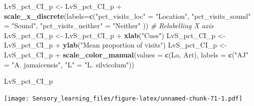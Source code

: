\documentclass[]{article}
\newenvironment{Shaded}{\begin{snugshade}}{\end{snugshade}}
\newcommand{\KeywordTok}[1]{\textcolor[rgb]{0.13,0.29,0.53}{\textbf{{#1}}}}
\newcommand{\DataTypeTok}[1]{\textcolor[rgb]{0.13,0.29,0.53}{{#1}}}
\newcommand{\StringTok}[1]{\textcolor[rgb]{0.31,0.60,0.02}{{#1}}}
\newcommand{\CommentTok}[1]{\textcolor[rgb]{0.56,0.35,0.01}{\textit{{#1}}}}
\newcommand{\NormalTok}[1]{{#1}}
\begin{document}
\begin{Shaded}
\begin{Highlighting}[]
\NormalTok{LvS_pct_CI_p <-}\StringTok{ }\NormalTok{LvS_pct_CI_p +}\StringTok{ }\KeywordTok{scale_x_discrete}\NormalTok{(}\DataTypeTok{labels=}\KeywordTok{c}\NormalTok{(}\StringTok{"pct_visits_loc"} \NormalTok{=}\StringTok{ "Location"}\NormalTok{, }\StringTok{"pct_visits_sound"} \NormalTok{=}\StringTok{ "Sound"}\NormalTok{,}
                              \StringTok{"pct_visits_neither"} \NormalTok{=}\StringTok{ "Neither"} \NormalTok{))  }\CommentTok{# Relabelling X axis}
\NormalTok{LvS_pct_CI_p <-}\StringTok{ }\NormalTok{LvS_pct_CI_p +}\StringTok{ }\KeywordTok{xlab}\NormalTok{(}\StringTok{"Cues"}\NormalTok{)}
\NormalTok{LvS_pct_CI_p <-}\StringTok{ }\NormalTok{LvS_pct_CI_p +}\StringTok{ }\KeywordTok{ylab}\NormalTok{(}\StringTok{"Mean proportion of visits"}\NormalTok{)}
\NormalTok{LvS_pct_CI_p <-}\StringTok{ }\NormalTok{LvS_pct_CI_p +}\StringTok{ }\KeywordTok{scale_color_manual}\NormalTok{(}\DataTypeTok{values =} \KeywordTok{c}\NormalTok{(Lo, Art), }\DataTypeTok{labels =} \KeywordTok{c}\NormalTok{(}\StringTok{"AJ"} \NormalTok{=}\StringTok{ "A. jamaicensis"}\NormalTok{, }\StringTok{"L"} \NormalTok{=}\StringTok{ "L. silvicolum"}\NormalTok{))}


\NormalTok{LvS_pct_CI_p                    }
\end{Highlighting}
\end{Shaded}

\texttt{[image: Sensory\_learning\_files/figure-latex/unnamed-chunk-71-1.pdf]}
\end{document}
